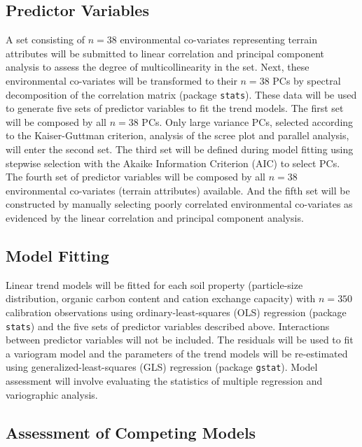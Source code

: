 \subsection{Predictor Variables}

A set consisting of $n=38$ environmental co-variates representing terrain attributes will be submitted to linear correlation and principal component analysis to assess the degree of multicollinearity in the set. Next, these environmental co-variates will be transformed to their $n=38$ PCs by spectral decomposition of the correlation matrix (package \texttt{stats}). These data will be used to generate five sets of predictor variables to fit the trend models. The first set will be composed by all $n=38$ PCs. Only large variance PCs, selected according to the Kaiser-Guttman criterion, analysis of the scree plot and parallel analysis, will enter the second set. The third set will be defined during model fitting using stepwise selection with the Akaike Information Criterion (AIC) to select PCs. The fourth set of predictor variables will be composed by all $n=38$ environmental co-variates (terrain attributes) available. And the fifth set will be constructed by manually selecting poorly correlated environmental co-variates as evidenced by the linear correlation and principal component analysis.

\subsection{Model Fitting}

Linear trend models will be fitted for each soil property (particle-size distribution, organic carbon content and cation exchange capacity) with $n=350$ calibration observations using ordinary-least-squares (OLS) regression (package \texttt{stats}) and the five sets of predictor variables described above. Interactions between predictor variables will not be included. The residuals will be used to fit a variogram model and the parameters of the trend models will be re-estimated using generalized-least-squares (GLS) regression (package \texttt{gstat}). Model assessment will involve evaluating the statistics of multiple regression and variographic analysis.

\subsection{Assessment of Competing Models}

